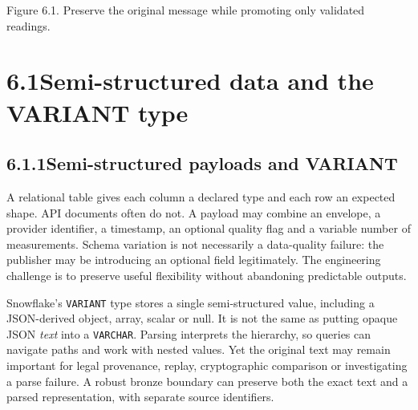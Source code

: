 \documentclass[11pt,twoside]{article}
\newcommand{\topic}[2]{\subsection*{#1\quad #2}}
\begin{document}
\begin{center}
\par{\fontsize{8}{10}\selectfont\color{inkgray}Figure 6.1. Preserve the original message while promoting only validated readings.}\end{center}
\newpage
\section*{6.1\quad Semi-structured data and the VARIANT type}
\topic{6.1.1}{Semi-structured payloads and VARIANT}
A relational table gives each column a declared type and each row an expected shape. API documents often do not. A payload may combine an envelope, a provider identifier, a timestamp, an optional quality flag and a variable number of measurements. Schema variation is not necessarily a data-quality failure: the publisher may be introducing an optional field legitimately. The engineering challenge is to preserve useful flexibility without abandoning predictable outputs.

Snowflake's \texttt{VARIANT} type stores a single semi-structured value, including a JSON-derived object, array, scalar or null. It is not the same as putting opaque JSON \emph{text} into a \texttt{VARCHAR}. Parsing interprets the hierarchy, so queries can navigate paths and work with nested values. Yet the original text may remain important for legal provenance, replay, cryptographic comparison or investigating a parse failure. A robust bronze boundary can preserve both the exact text and a parsed representation, with separate source identifiers.
\end{document}
